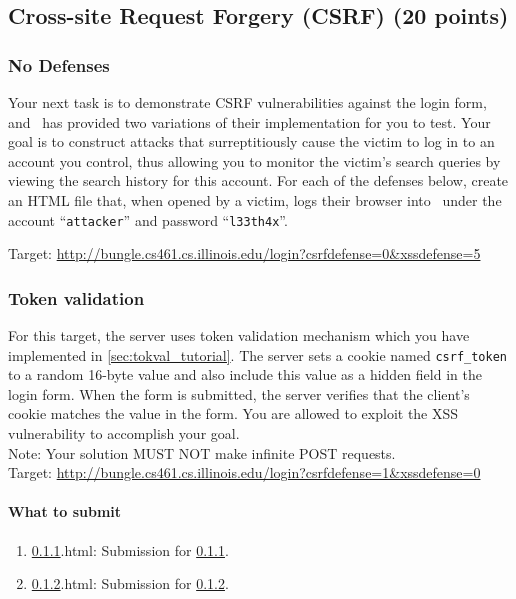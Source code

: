 \documentclass[letterpaper,12pt]{report}
\newcommand{\bungledomain}{http://bungle.cs461.cs.illinois.edu}
\begin{document}
\pagebreak

\subsection{Cross-site Request Forgery (CSRF) (20 points)}
\label{sec:csrf}

\subsubsection{No Defenses}
\label{sec:csrf_no_defenses}
Your next task is to demonstrate CSRF vulnerabilities against the login form, and \bungle\ has provided two variations of their implementation for you to test.  Your goal is to construct attacks that surreptitiously cause the victim to log in to an account you control, thus allowing you to monitor the victim's search queries by viewing the search history for this account.  For each of the defenses below, create an HTML file that, when opened by a victim, logs their browser into \bungle\ under the account ``\texttt{attacker}'' and password ``\texttt{l33th4x}''.\newline

{Target: \url{\bungledomain/login?csrfdefense=0\&xssdefense=5}}

\subsubsection{Token validation}
\label{sec:csrf_tok}
For this target, the server uses token validation mechanism which you have implemented in \ref{sec:tokval_tutorial}. The server sets a cookie named \texttt{csrf\_token} to a random 16-byte value and also include this value as a hidden field in the login form.  When the form is submitted, the server verifies that the client's cookie matches the value in the form.  You are allowed to exploit the XSS vulnerability to accomplish your goal.\\
Note: Your solution MUST NOT make infinite POST requests.\\

{Target: \url{\bungledomain/login?csrfdefense=1\&xssdefense=0}}\\

\paragraph{What to submit} 
\begin{enumerate}
\item {\ref{sec:csrf_no_defenses}.html}: Submission for \ref{sec:csrf_no_defenses}.
\item {\ref{sec:csrf_tok}.html}: Submission for \ref{sec:csrf_tok}.
\end{enumerate}
\end{document}
